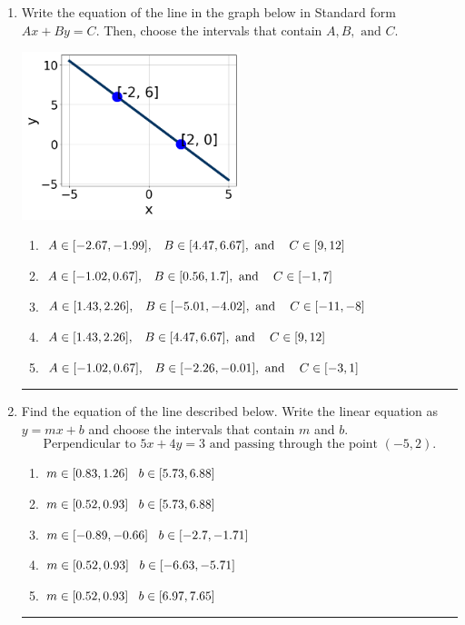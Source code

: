 \documentclass[14pt]{extbook}
\newcommand{\litem}[1]{\item#1\hspace*{-1cm}\rule{\textwidth}{0.4pt}}
\begin{document}
\begin{enumerate}
{\begin{enumerate}[label=\Alph*.]
\end{enumerate} }
\litem{
Write the equation of the line in the graph below in Standard form $Ax+By=C$. Then, choose the intervals that contain $A, B, \text{ and } C$.
\begin{center}
    \includegraphics[width=0.5\textwidth]{../Figures/linearGraphToStandardCopyC.png}
\end{center}
\begin{enumerate}[label=\Alph*.]
\item \( A \in [-2.67, -1.99], \hspace{3mm} B \in [4.47, 6.67], \text{ and } \hspace{3mm} C \in [9, 12] \)
\item \( A \in [-1.02, 0.67], \hspace{3mm} B \in [0.56, 1.7], \text{ and } \hspace{3mm} C \in [-1, 7] \)
\item \( A \in [1.43, 2.26], \hspace{3mm} B \in [-5.01, -4.02], \text{ and } \hspace{3mm} C \in [-11, -8] \)
\item \( A \in [1.43, 2.26], \hspace{3mm} B \in [4.47, 6.67], \text{ and } \hspace{3mm} C \in [9, 12] \)
\item \( A \in [-1.02, 0.67], \hspace{3mm} B \in [-2.26, -0.01], \text{ and } \hspace{3mm} C \in [-3, 1] \)

\end{enumerate} }
\litem{
Find the equation of the line described below. Write the linear equation as $ y=mx+b $ and choose the intervals that contain $m$ and $b$.\[ \text{Perpendicular to } 5 x + 4 y = 3 \text{ and passing through the point } (-5, 2). \]\begin{enumerate}[label=\Alph*.]
\item \( m \in [0.83, 1.26] \hspace*{3mm} b \in [5.73, 6.88] \)
\item \( m \in [0.52, 0.93] \hspace*{3mm} b \in [5.73, 6.88] \)
\item \( m \in [-0.89, -0.66] \hspace*{3mm} b \in [-2.7, -1.71] \)
\item \( m \in [0.52, 0.93] \hspace*{3mm} b \in [-6.63, -5.71] \)
\item \( m \in [0.52, 0.93] \hspace*{3mm} b \in [6.97, 7.65] \)


\end{enumerate}}
\end{enumerate}
\end{document}
